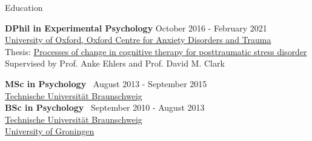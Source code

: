 \documentclass{resume} %
\begin{document}



\begin{rSection}{Education}

{\bf DPhil in Experimental Psychology} \hfill {October 2016 - February 2021} \\ 
  \href{https://www.psy.ox.ac.uk/research/oxford-centre-for-anxiety-disorders-and-trauma}{University of Oxford, Oxford Centre for Anxiety Disorders and Trauma} \smallskip \\
  Thesis: \href{https://ora.ox.ac.uk/objects/uuid:96ac1526-0405-4147-b071-2b3bb0e24802}{Processes of change in cognitive therapy for posttraumatic stress disorder}  \\
  Supervised by Prof. Anke Ehlers and Prof. David M. Clark \smallskip

{\bf MSc in Psychology} \hfill {\ August 2013 - September 2015} \\ 
  \href{https://www.tu-braunschweig.de/en}{Technische Universit{\"a}t Braunschweig} \\

{\bf BSc in Psychology} \hfill {\ September 2010 - August 2013} \\ 
  \href{https://www.tu-braunschweig.de/en}{Technische Universit{\"a}t Braunschweig} \\
  \href{https://www.rug.nl/?lang=en}{University of Groningen} \smallskip

\end{rSection}
\end{document}
